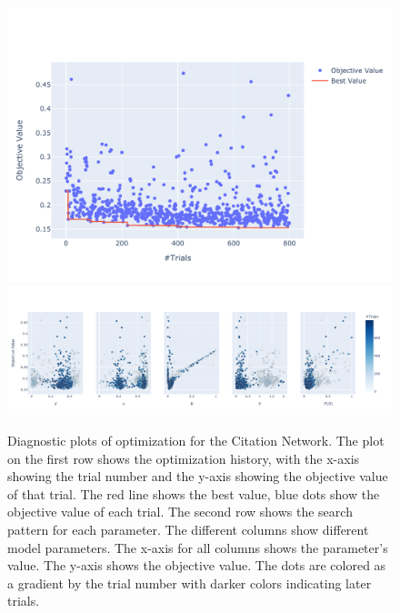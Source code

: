 \documentclass[11pt]{article}
\begin{document}
\begin{figure}[H]
    \centering
    \includegraphics[width=.7\linewidth]{../plots/overall/Optimization_History_netscience.pdf}
    \includegraphics[width=.7\linewidth]{../plots/overall/Plot_Slice_netscience.pdf}
  \caption{Diagnostic plots of optimization for the Citation Network. The plot on the first row shows the optimization history, with the x-axis showing the trial number and the y-axis showing the objective value of that trial. The red line shows the best value, blue dots show the objective value of each trial. The second row shows the search pattern for each parameter. The different columns show different model parameters. The x-axis for all columns shows the parameter's value. The y-axis shows the objective value. The dots are colored as a gradient by the trial number with darker colors indicating later trials.}
  \label{appendix:optimization_netscience}
\end{figure}
\end{document}
